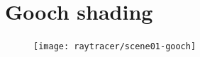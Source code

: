 \documentclass{beamer}
\begin{document}
\section{Gooch shading}
\begin{frame}
	\begin{figure}
		\texttt{[image: raytracer/scene01-gooch]}
	\end{figure}
\end{frame}
\end{document}
